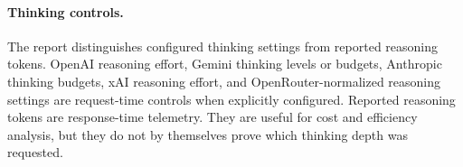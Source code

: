\paragraph{Thinking controls.}
The report distinguishes configured thinking settings from reported reasoning
tokens. OpenAI reasoning effort, Gemini thinking levels or budgets, Anthropic
thinking budgets, xAI reasoning effort, and OpenRouter-normalized reasoning
settings are request-time controls when explicitly configured. Reported
reasoning tokens are response-time telemetry. They are useful for cost and
efficiency analysis, but they do not by themselves prove which thinking depth
was requested.
